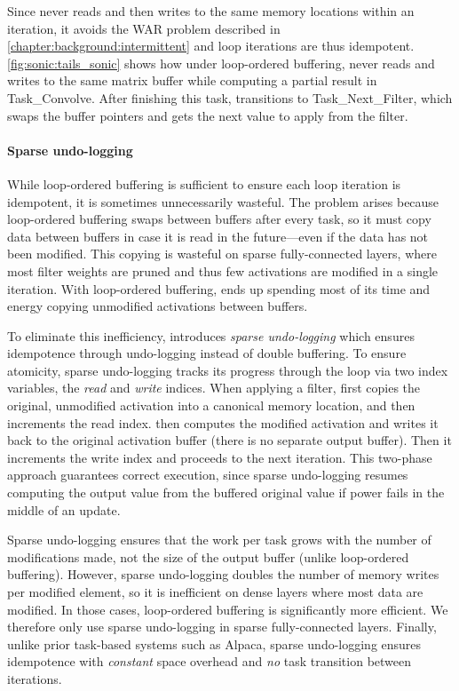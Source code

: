 Since \sonic never reads and then writes to the same memory locations within an iteration,
it avoids the WAR problem described in \autoref{chapter:background:intermittent}
and loop iterations are thus idempotent.
%
\autoref{fig:sonic:tails_sonic} shows how under loop-ordered buffering, \sonic never 
reads and writes to the same matrix buffer while computing a partial result in \textsf{Task\_Convolve}.
After finishing this task, \sonic transitions to \textsf{Task\_Next\_Filter}, which swaps the buffer pointers
and gets the next value to apply from the filter.

\paragraph{Sparse undo-logging}
While loop-ordered buffering is sufficient to ensure each loop iteration is idempotent,
it is sometimes unnecessarily wasteful.
%
The problem arises because loop-ordered buffering swaps between buffers after every task,
so it must copy data between buffers in case it is read in the future---even if the data has not been modified.
%
This copying is wasteful on sparse fully-connected layers,
where most filter weights are pruned and thus few activations are modified in a single iteration.
%
With loop-ordered buffering, \sonic ends up spending most of its time 
and energy copying unmodified activations between buffers.

To eliminate this inefficiency, \sonic introduces \emph{sparse undo-logging}
which ensures idempotence through undo-loggi\-ng instead of double buffering.
To ensure atomicity, sparse undo-logging tracks its progress through the loop via two index variables,
the \emph{read} and \emph{write} indices.
When applying a filter,
\sonic first copies the original, unmodified activation into a canonical memory location,
and then increments the read index.
\sonic then computes the modified activation and writes it back to the original activation buffer
(there is no separate output buffer).
Then it increments the write index and proceeds to the next iteration.
This two-phase approach guarantees correct execution,
since sparse undo-logging resumes computing the output value from the buffered original value if power fails in the middle of an update.

Sparse undo-logging ensures that the work per task grows with the number of modifications made,
not the size of the output buffer (unlike loop-ordered buffering).
However, sparse undo-logging doubles the number of memory writes per modified element,
so it is inefficient on dense layers where most data are modified.
In those cases, loop-ordered buffering is significantly more efficient.
We therefore only use sparse undo-logging in sparse fully-connected layers.
Finally, unlike prior task-based systems such as Alpaca,
sparse undo-logging ensures idempotence with \emph{constant} space overhead
and \emph{no} task transition between iterations.

